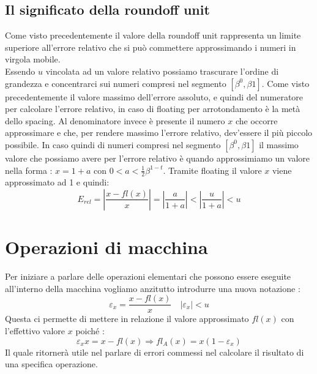 \documentclass[12pt, a4paper]{book}
\theoremstyle{definition}
\begin{document}
\subsection{Il significato della roundoff unit}
\begin{flushleft}
Come visto precedentemente il valore della roundoff unit rappresenta un limite superiore all'errore relativo che si può commettere approssimando i numeri in virgola mobile. \\
Essendo $u$ vincolata ad un valore relativo possiamo trascurare l'ordine di grandezza e concentrarci sui numeri compresi nel segmento $[\beta^{0}, \beta{1}].$
Come visto precedentemente il valore massimo dell'errore assoluto, e quindi del numeratore per calcolare l'errore relativo,  in caso di floating per arrotondamento è la metà dello spacing.
Al denominatore invece è presente il numero $x$ che occorre approssimare e che,  per rendere massimo l'errore relativo, dev'essere il più piccolo possibile. 
In caso quindi di numeri compresi nel segmento $[\beta^{0}, \beta{1}]$ il massimo valore che possiamo avere per l'errore relativo è quando approssimiamo un valore nella forma : $x = 1 + a$ con  $0 < a <  \frac{1}{2}\beta^{1-t}.$
Tramite floating il valore $x$ viene approssimato ad 1 e quindi:
\[E_{rel} = \displaystyle\left\lvert \frac{x - fl(x)}{x} \right\rvert = \displaystyle\left\lvert \frac{a}{1+a} \right\rvert < \displaystyle\left\lvert \frac{u}{1+a} \right\rvert < u \]
\end{flushleft}

\section{Operazioni di macchina}
\begin{flushleft}
Per iniziare a parlare delle operazioni elementari che possono essere eseguite all'interno della macchina vogliamo anzitutto introdurre una nuova notazione : 
\[ \varepsilon_{x} = \frac{x - fl(x)}{x} \quad |\varepsilon_{x}| < u \]
Questa ci permette di mettere in relazione il valore approssimato $fl(x)$ con l'effettivo valore $x$ poiché :
\[  \varepsilon_{x}x =  x - fl(x) \Longrightarrow fl_{A}(x) = x(1 - \varepsilon_{x}) \]
Il quale ritornerà utile nel parlare di errori commessi nel calcolare il risultato di una specifica operazione.
\end{flushleft}
\end{document}
